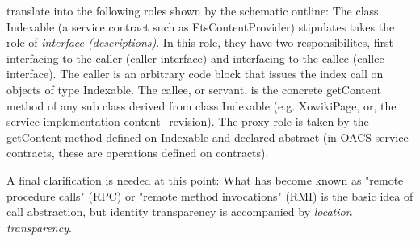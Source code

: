 translate into the following roles shown by the schematic outline: The
class Indexable (a service contract such as FtsContentProvider)
stipulates takes the role of \emph{interface (descriptions)}. In this
role, they have two responsibilites, first interfacing to the caller
(caller interface) and interfacing to the callee (callee
interface). The caller is an arbitrary code block that issues the
index call on objects of type Indexable. The callee, or servant, is
the concrete getContent method of any sub class derived from class
Indexable (e.g. XowikiPage, or, the service implementation
content\_revision). The proxy role is taken by the getContent method
defined on Indexable and declared abstract (in OACS service contracts,
these are operations defined on contracts).

A final clarification is needed at this point: What has become known
as "remote procedure calls" (RPC) or "remote method invocations" (RMI)
is the basic idea of call abstraction, but identity transparency is
accompanied by \emph{location transparency}.
